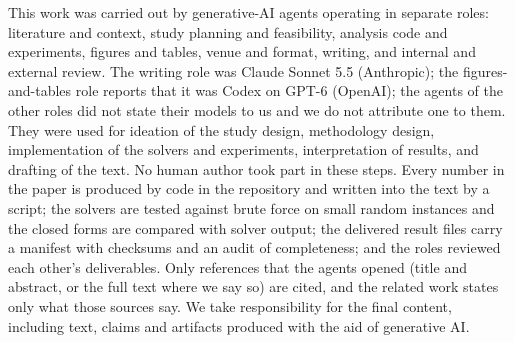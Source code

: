This work was carried out by generative-AI agents operating in separate roles: literature and context, study planning and feasibility, analysis code and experiments, figures and tables, venue and format, writing, and internal and external review. The writing role was Claude Sonnet 5.5 (Anthropic); the figures-and-tables role reports that it was Codex on GPT-6 (OpenAI); the agents of the other roles did not state their models to us and we do not attribute one to them. They were used for ideation of the study design, methodology design, implementation of the solvers and experiments, interpretation of results, and drafting of the text. No human author took part in these steps. Every number in the paper is produced by code in the repository and written into the text by a script; the solvers are tested against brute force on small random instances and the closed forms are compared with solver output; the delivered result files carry a manifest with checksums and an audit of completeness; and the roles reviewed each other's deliverables. Only references that the agents opened (title and abstract, or the full text where we say so) are cited, and the related work states only what those sources say. We take responsibility for the final content, including text, claims and artifacts produced with the aid of generative AI.
